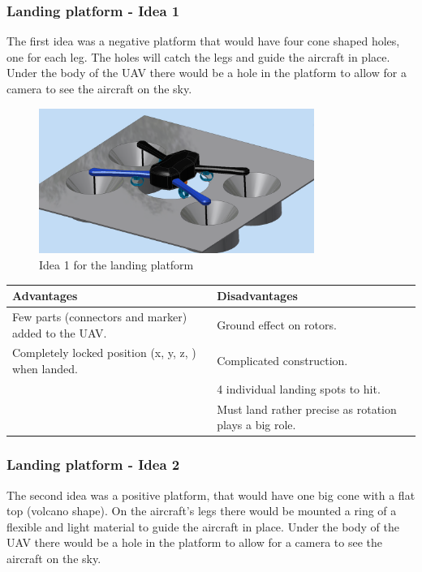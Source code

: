 \subsubsection{Landing platform - Idea 1}
The first idea was a negative platform that would have four cone shaped holes, one for each leg. The holes will catch the legs and guide the aircraft in place. Under the body of the UAV there would be a hole in the platform to allow for a camera to see the aircraft on the sky.
\begin{figure}
	\centering
	\includegraphics[width=0.8\textwidth]{imgs/mockup_idea_2}
	\caption{Idea 1 for the landing platform}
\end{figure}
\begin{center}
	\begin{tabular}{p{6.5cm} p{6.5cm}}
		\toprule
		\textbf{Advantages}                                            & Disadvantages \\\midrule
		Few parts (connectors and marker) added to the UAV.            & Ground effect on rotors. \\
		Completely locked position (x, y, z, \texttheta ) when landed. & Complicated construction. \\
			                                                           & 4 individual landing spots to hit. \\
	                                                                   & Must land rather precise as rotation plays a big role.\\\bottomrule
	\end{tabular}
\end{center}
\subsubsection{Landing platform - Idea 2}
The second idea was a positive platform, that would have one big cone with a flat top (volcano shape). On the aircraft's legs there would be mounted a ring of a flexible and light material to guide the aircraft in place. Under the body of the UAV there would be a hole in the platform to allow for a camera to see the aircraft on the sky.


